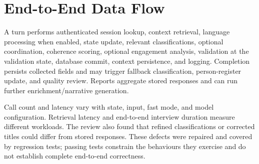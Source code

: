 \section{End-to-End Data Flow}
\label{sec:arch-dataflow}

A turn performs authenticated session lookup, context retrieval, language
processing when enabled, state update, relevant classifications, optional
coordination, coherence scoring, optional engagement analysis, validation
at the validation state, database commit, context persistence, and
logging. Completion persists collected fields and may trigger fallback
classification, person-register update, and quality review. Reports
aggregate stored responses and can run further enrichment/narrative
generation.

Call count and latency vary with state, input, fast mode, and model
configuration. Retrieval latency and end-to-end interview duration measure
different workloads. The review also found that refined classifications
or corrected titles could differ from stored responses. These defects were
repaired and covered by regression tests; passing tests constrain the
behaviours they exercise and do not establish complete end-to-end
correctness.
